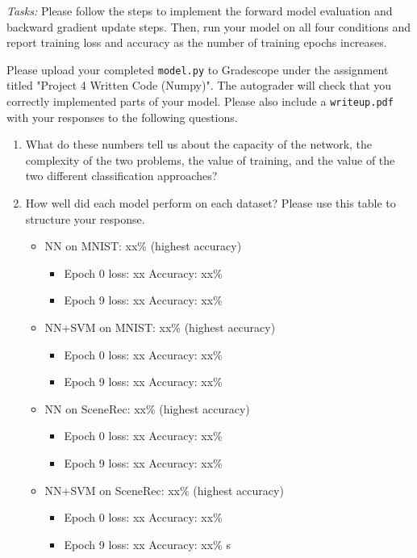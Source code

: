 \emph{Tasks:} Please follow the steps to implement the forward model evaluation and backward gradient update steps. Then, run your model on all four conditions and report training loss and accuracy as the number of training epochs increases.


Please upload your completed \texttt{model.py} to Gradescope under the assignment titled "Project 4 Written Code (Numpy)". The autograder will check that you correctly implemented parts of your model. Please also include a \texttt{writeup.pdf} with your responses to the following questions.

\begin{enumerate}
    \item What do these numbers tell us about the capacity of the network, the complexity of the two problems, the value of training, and the value of the two different classification approaches?

    \item How well did each model perform on each dataset? Please use this table to structure your response.

          \begin{itemize}
              \item NN on MNIST: xx\% (highest accuracy)
                    \begin{itemize}
                        \item Epoch 0 loss: xx     Accuracy: xx\%
                        \item Epoch 9 loss: xx     Accuracy: xx\%
                    \end{itemize}
              \item NN+SVM on MNIST: xx\% (highest accuracy)
                    \begin{itemize}
                        \item Epoch 0 loss: xx     Accuracy: xx\%
                        \item Epoch 9 loss: xx     Accuracy: xx\%
                    \end{itemize}
              \item NN on SceneRec: xx\% (highest accuracy)
                    \begin{itemize}
                        \item Epoch 0 loss: xx     Accuracy: xx\%
                        \item Epoch 9 loss: xx     Accuracy: xx\%
                    \end{itemize}
              \item NN+SVM on SceneRec: xx\% (highest accuracy)
                    \begin{itemize}
                        \item Epoch 0 loss: xx     Accuracy: xx\%
                        \item Epoch 9 loss: xx     Accuracy: xx\%
                              s\end{itemize}
          \end{itemize}

\end{enumerate}

